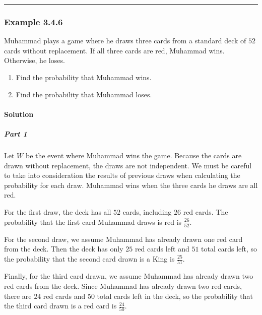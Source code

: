 \documentclass[letterpaper,10pt,english]{jupyterBook}
\begin{document}
\bigskip\hrule\bigskip



\subsubsection{Example 3.4.6}
\label{\detokenize{Ch3 Probability/3.4 Addition Rules and Mutually Exclusive Events:example-3-4-6}}
\sphinxAtStartPar
Muhammad plays a game where he draws three cards from a standard deck of \(52\) cards without replacement. If all three cards are red, Muhammad wins. Otherwise, he loses.
\begin{enumerate}
%
\item {} 
\sphinxAtStartPar
Find the probability that Muhammad wins.

\item {} 
\sphinxAtStartPar
Find the probability that Muhammad loses.

\end{enumerate}


\paragraph{Solution}
\label{\detokenize{Ch3 Probability/3.4 Addition Rules and Mutually Exclusive Events:id15}}

\subparagraph{Part 1}
\label{\detokenize{Ch3 Probability/3.4 Addition Rules and Mutually Exclusive Events:id16}}
\sphinxAtStartPar
Let \(W\) be the event where Muhammad wins the game. Because the cards are drawn without replacement, the draws are not independent. We must be careful to take into consideration the results of previous draws when calculating the probability for each draw. Muhammad wins when the three cards he draws are all red.

\sphinxAtStartPar
For the first draw, the deck has all \(52\) cards, including \(26\) red cards. The probability that the first card Muhammad draws is red is \(\frac{26}{52}\).

\sphinxAtStartPar
For the second draw, we assume Muhammad has already drawn one red card from the deck. Then the deck has only \(25\) red cards left and \(51\) total cards left, so the probability that the second card drawn is a King is \(\frac{25}{51}\).

\sphinxAtStartPar
Finally, for the third card drawn, we assume Muhammad has already drawn two red cards from the deck. Since Muhammad has already drawn two red cards, there are \(24\) red cards and \(50\) total cards left in the deck, so the probability that the third card drawn is a red card is \(\frac{24}{50}\).
\end{document}
